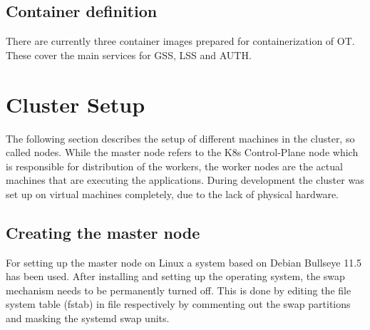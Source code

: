 
\subsection{Container definition}
There are currently three container images prepared for containerization of \ac{OT}. These cover the main services for \ac{GSS}, \ac{LSS} and \ac{AUTH}. 









\section{Cluster Setup}
The following section describes the setup of different machines in the cluster, so called nodes. While the master node refers to the \ac{K8s} Control-Plane node which is responsible for distribution of the workers, the worker nodes are the actual machines that are executing the applications. During development the cluster was set up on virtual machines completely, due to the lack of physical hardware.


\subsection{Creating the master node}
For setting up the master node on Linux a system based on Debian Bullseye 11.5 has been used. After installing and setting up the operating system, the swap mechanism needs to be permanently turned off. This is done by editing the file system table (fstab) in file  respectively by commenting out the swap partitions and masking the systemd swap units.


